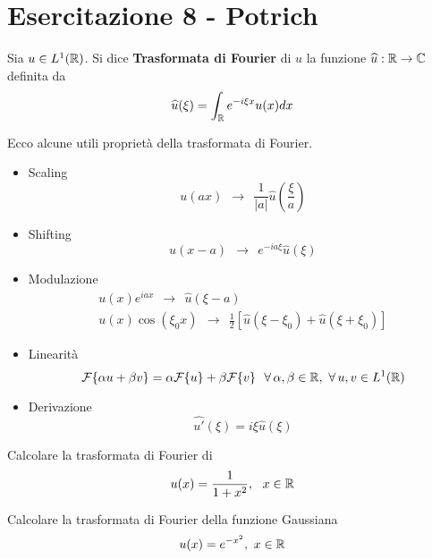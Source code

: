 \chapter{Esercitazione 8 - Potrich}
\ParteEsercizi
\begin{defn}
Sia $u\in L^{1}(\mathbb{R} )$. Si dice \textbf{Trasformata di Fourier} di $u$ la funzione $\widehat{u} :\mathbb{R} \rightarrow \mathbb{C} $ definita da
\begin{equation*}
\widehat{u}( \xi ) =\int _{\mathbb{R} } e^{-i\xi x} u( x) dx
\end{equation*}
\end{defn}
\begin{thm}
[Proprietà] Ecco alcune utili proprietà della trasformata di Fourier.
\begin{itemize}
\item Scaling\begin{equation*}
u( ax) \ \ \rightarrow \ \ \frac{1}{| a| }\hat{u}\left(\frac{\xi }{a}\right)
\end{equation*}
\item Shifting\begin{equation*}
u( x-a) \ \ \rightarrow \ \ e^{-ia\xi }\hat{u}( \xi )
\end{equation*}
\item Modulazione\begin{gather*}
u( x) e^{iax} \ \ \rightarrow \ \ \hat{u}( \xi -a)\\
u( x)\cos( \xi _{0} x) \ \ \rightarrow \ \ \frac{1}{2}[\hat{u}( \xi -\xi _{0}) +\hat{u}( \xi +\xi _{0})]
\end{gather*}
\item Linearità\begin{equation*}
\Fc \{\alpha u+\beta v\} =\alpha \Fc \{u\} +\beta \Fc \{v\} \ \ \forall \alpha ,\beta \in \RR  ,\ \forall u,v\in L^{1}(\RR )
\end{equation*}
\item Derivazione\begin{equation*}
\widehat{u'}( \xi ) =i\xi \hat{u}( \xi )
\end{equation*}
\end{itemize}
\end{thm}

Calcolare la trasformata di Fourier di
\begin{equation*}
u( x) =\frac{1}{1+x^{2}} ,\ \ x\in \mathbb{R} 
\end{equation*}

Calcolare la trasformata di Fourier della funzione Gaussiana
\begin{equation*}
u( x) =e^{-x^{2}} ,\ x\in \mathbb{R} 
\end{equation*}
\Esercizio{}

